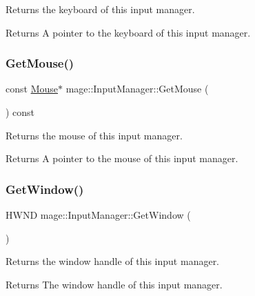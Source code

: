 Returns the keyboard of this input manager.

\begin{DoxyReturn}{Returns}
A pointer to the keyboard of this input manager. 
\end{DoxyReturn}
\hypertarget{classmage_1_1_input_manager_aae51ef1fb225466d956f75372f166e38}{}\label{classmage_1_1_input_manager_aae51ef1fb225466d956f75372f166e38} 
\subsubsection{\texorpdfstring{Get\+Mouse()}{GetMouse()}}
{\footnotesize\ttfamily const \hyperlink{classmage_1_1_mouse}{Mouse}$\ast$ mage\+::\+Input\+Manager\+::\+Get\+Mouse (\begin{DoxyParamCaption}{ }\end{DoxyParamCaption}) const\hspace{0.3cm}{\ttfamily [noexcept]}}

Returns the mouse of this input manager.

\begin{DoxyReturn}{Returns}
A pointer to the mouse of this input manager. 
\end{DoxyReturn}
\hypertarget{classmage_1_1_input_manager_a21d07df65018d5dcc1511afe7310dc85}{}\label{classmage_1_1_input_manager_a21d07df65018d5dcc1511afe7310dc85} 
\subsubsection{\texorpdfstring{Get\+Window()}{GetWindow()}}
{\footnotesize\ttfamily H\+W\+ND mage\+::\+Input\+Manager\+::\+Get\+Window (\begin{DoxyParamCaption}{ }\end{DoxyParamCaption})\hspace{0.3cm}{\ttfamily [noexcept]}}

Returns the window handle of this input manager.

\begin{DoxyReturn}{Returns}
The window handle of this input manager. 
\end{DoxyReturn}
\hypertarget{classmage_1_1_input_manager_aaee6f1acc558620d2cf6313f3eb36a35}{}\label{classmage_1_1_input_manager_aaee6f1acc558620d2cf6313f3eb36a35} 
